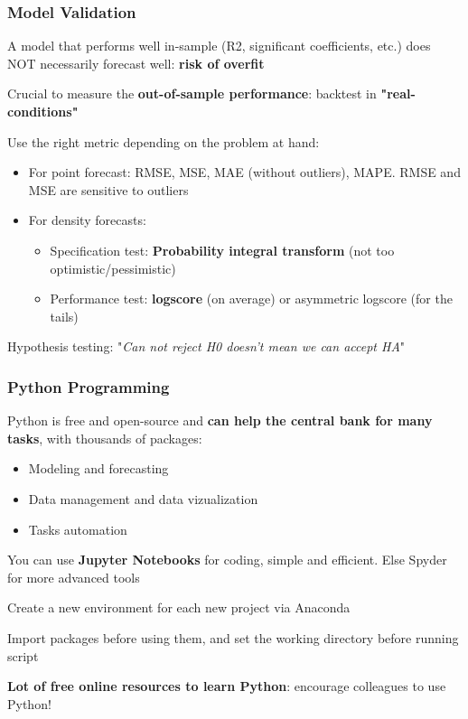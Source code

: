 \documentclass{beamer}
\newenvironment{wideitemize}{\itemize\addtolength{\itemsep}{10pt}}{\enditemize}
\begin{document}
\begin{frame}
  \frametitle{Model Validation}
 \begin{wideitemize}
    \item A model that performs well in-sample (R2, significant coefficients, etc.) does NOT necessarily forecast well: \textbf{risk of overfit}
  \item Crucial to measure the \textbf{out-of-sample performance}: backtest in \textbf{"real-conditions"}
  \item Use the right metric depending on the problem at hand:
    \begin{itemize}
    \item For point forecast: RMSE, MSE, MAE (without outliers), MAPE. RMSE and MSE are sensitive to outliers
    \item For density forecasts:
      \begin{itemize}
      \item Specification test: \textbf{Probability integral transform} (not too optimistic/pessimistic)
      \item Performance test: \textbf{logscore} (on average) or asymmetric logscore (for the tails)
      \end{itemize}
    \end{itemize}
   \item Hypothesis testing: "\emph{Can not reject H0 doesn't mean we can accept HA}"
\end{wideitemize}
\end{frame}


\begin{frame}
  \frametitle{Python Programming}
  \begin{wideitemize}
  \item Python is free and open-source and \textbf{can help the central bank for many tasks}, with thousands of packages:
    \begin{itemize}
    \item Modeling and forecasting
    \item Data management and data vizualization
    \item Tasks automation
    \end{itemize}
    \item You can use \textbf{Jupyter Notebooks} for coding, simple and efficient. Else Spyder for more advanced tools
    \item Create a new environment for each new project via Anaconda
    \item Import packages before using them, and set the working directory before running script
    \item \textbf{Lot of free online resources to learn Python}: encourage colleagues to use Python!
  \end{wideitemize}

\end{frame}
\end{document}
